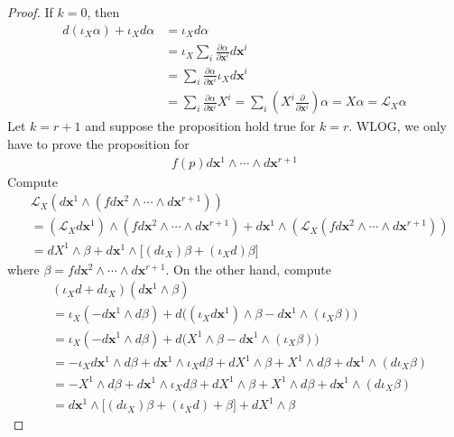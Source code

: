 \documentclass{report}
\begin{document}
\begin{proof}
If $k=0$, then 
 \begin{align*}
d(\iota_X \alpha  )+\iota_X d\alpha &= \iota_X d\alpha  \\
&=\iota_X \sum_i \frac{\partial \alpha}{\partial \textbf{x}^i}d\textbf{x}^i \\
&=\sum_i \frac{\partial \alpha }{\partial \textbf{x}^i}\iota_X d\textbf{x}^i \\
&=\sum_i \frac{\partial \alpha }{\partial \textbf{x}^i} X^i = \sum_{i} (X^i \frac{\partial }{\partial \textbf{x}^i}) \alpha = X\alpha = \mathcal{L}_X \alpha 
\end{align*}
Let $k=r+1$ and suppose the proposition hold true for $k=r$. WLOG, we only have to prove the proposition for 
\begin{align*}
f(p)d\textbf{x}^1 \wedge  \cdots \wedge  d\textbf{x}^{r+1}  
\end{align*}
Compute 
\begin{align*}
&\mathcal{L}_X (d\textbf{x}^1 \wedge  (fd\textbf{x}^2\wedge  \cdots \wedge   d\textbf{x}^{r+1} )  ) \\
&= (\mathcal{L}_X d\textbf{x}^1)\wedge  (fd\textbf{x}^2\wedge  \cdots \wedge  d\textbf{x}^{r+1}  ) + d\textbf{x}^1 \wedge (\mathcal{L}_X (fd\textbf{x}^2 \wedge  \cdots \wedge d\textbf{x}^{r+1}  )) \\
&=dX^1\wedge \beta  + d\textbf{x}^1 \wedge \big[ (d \iota_X)\beta +(\iota_X d  )\beta         \big]    
\end{align*}
where $\beta = fd\textbf{x}^2 \wedge  \cdots \wedge  d\textbf{x}^{r+1}  $. On the other hand, compute 
\begin{align*}
  &(\iota_X d+ d \iota_X)(d\textbf{x}^1 \wedge  \beta  )\\
  &= \iota_X (-d\textbf{x}^1 \wedge  d\beta )+ d\Big((\iota_X d\textbf{x}^1)\wedge \beta - d\textbf{x}^1 \wedge  (\iota_X \beta   )      \Big) \\
  &=\iota_X (-d\textbf{x}^1 \wedge  d\beta  )+ d\Big( X^1 \wedge  \beta - d\textbf{x}^1 \wedge  (\iota_X \beta  )   \Big) \\
  &= -\iota_X d\textbf{x}^1  \wedge  d\beta  + d\textbf{x}^1 \wedge  \iota_X d\beta + dX^1 \wedge  \beta  +X^1 \wedge  d\beta  + d\textbf{x}^1 \wedge  (d \iota_X \beta   )     \\
  &= -X^1 \wedge  d\beta  + d\textbf{x}^1 \wedge  \iota_X d\beta + dX^1 \wedge  \beta  +X^1 \wedge  d\beta  + d\textbf{x}^1 \wedge  (d \iota_X \beta   )     \\
  &=d\textbf{x}^1 \wedge  \big[ (d \iota_X )\beta + (\iota_X d )+ \beta    \big] + dX^1 \wedge  \beta  
\end{align*}
\end{proof}
\end{document}
